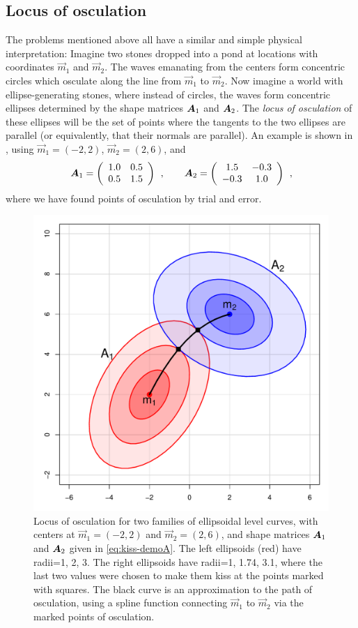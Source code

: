 \subsection{Locus of osculation}\label{sec:locus}
The problems mentioned above all have a similar and simple physical interpretation:  Imagine two stones dropped
into a pond at locations with coordinates $\vec{m}_1$ and $\vec{m}_2$.  The waves emanating from the centers
form concentric circles which osculate along the line from $\vec{m}_1$ to $\vec{m}_2$.
Now imagine a world with ellipse-generating stones, where instead of circles, the waves form concentric ellipses determined by
the shape matrices $\bm{A}_1$ and $\bm{A}_2$.
The \emph{locus of osculation} of these ellipses will be the set of points where the tangents
to the two ellipses are parallel (or equivalently, that their normals are parallel).  An
example is shown in , using $\vec{m}_1 = (-2, 2)$, $\vec{m}_2 = (2, 6)$, and
\begin{equation} \label{eq:kiss-demoA}
\bm{A}_1 = \left(
\begin{array}{cc}
 1.0 & 0.5 \\ 0.5 & 1.5
\end{array}
\right)
\:\: ,\quad\quad
\bm{A}_2 =\left(
\begin{array}{cc}
 1.5 & -0.3 \\ -0.3 & 1.0
\end{array}
\right) \:\: ,
\end{equation}
where we have found points of osculation by trial and error.  

\begin{figure}[htb!]
  \centering
  \includegraphics[width=.6\textwidth,clip]{fig/kiss-demo}
  \caption{Locus of osculation for two families of ellipsoidal level curves, with centers at $\vec{m}_1 = (-2, 2)$ and  $\vec{m}_2 = (2, 6)$,
  and shape matrices $\bm{A}_1$ and $\bm{A}_2$ given in \eqref{eq:kiss-demoA}.
  The left ellipsoids (red) have radii=1, 2, 3. The right ellipsoids
  have radii=1, 1.74, 3.1, where the last two values were chosen to make them kiss at the points marked with squares. The black curve is an
  approximation to the path of osculation, using a
  spline function connecting $\vec{m}_1$ to $\vec{m}_2$ via the marked points of osculation.}%
  \label{fig:kiss-demo}
\end{figure}

